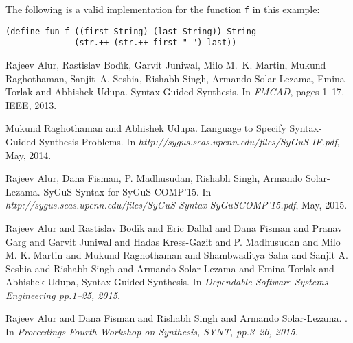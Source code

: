 \documentclass{llncs}
\begin{document}
The following is a valid implementation for the function \texttt{f} in this example:
\begin{verbatim}
(define-fun f ((first String) (last String)) String
              (str.++ (str.++ first " ") last))
\end{verbatim}


\begin{thebibliography}{1}

Rajeev Alur, Rastislav Bod\'{\i}k, Garvit Juniwal, Milo M.~K. Martin, Mukund
  Raghothaman, Sanjit~A. Seshia, Rishabh Singh, Armando Solar-Lezama, Emina
  Torlak and Abhishek Udupa.
\newblock Syntax-Guided Synthesis.
\newblock In {\em FMCAD}, pages 1--17. IEEE, 2013.



Mukund Raghothaman and Abhishek Udupa.
\newblock Language to Specify Syntax-Guided Synthesis Problems.
\newblock In {\em http://sygus.seas.upenn.edu/files/SyGuS-IF.pdf}, May, 2014.

Rajeev Alur, Dana Fisman, P. Madhusudan, Rishabh Singh, Armando Solar-Lezama.
\newblock SyGuS Syntax for SyGuS-COMP’15.
\newblock In {\em http://sygus.seas.upenn.edu/files/SyGuS-Syntax-SyGuSCOMP'15.pdf}, May, 2015.


        Rajeev Alur and
		Rastislav Bod{\'{\i}}k and
		Eric Dallal and
		Dana Fisman and
		Pranav Garg and
		Garvit Juniwal and
		Hadas Kress{-}Gazit and
		P. Madhusudan and
		Milo M. K. Martin and
		Mukund Raghothaman and
		Shambwaditya Saha and
		Sanjit A. Seshia and
		Rishabh Singh and
		Armando Solar{-}Lezama and
		Emina Torlak and
		Abhishek Udupa,
	\newblock Syntax-Guided Synthesis.
	\newblock In \em{Dependable Software Systems Engineering} pp.1--25, 2015.
	
	    Rajeev Alur and
		Dana Fisman and
		Rishabh Singh and
		Armando Solar{-}Lezama.
	.
	\newblock In \em{Proceedings Fourth Workshop on Synthesis}, {SYNT}, pp.{3--26}, 2015.
		
		

\end{thebibliography}
\end{document}
